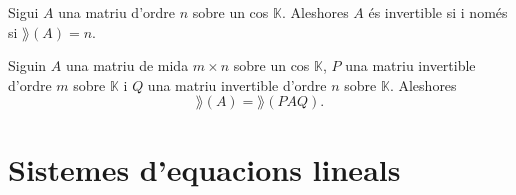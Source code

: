 \documentclass[../Apunts.tex]{subfiles}
\begin{document}
	\begin{corollary}
		Sigui \(A\) una matriu d'ordre \(n\) sobre un cos \(\mathbb{K}\). Aleshores \(A\) és invertible si i només si \(\rang(A)=n\).
	\end{corollary}
	\begin{observation}
		\label{obs:rang d'una matriu és invariant pel producte amb invertibles}
		Siguin \(A\) una matriu de mida \(m\times n\) sobre un cos \(\mathbb{K}\), \(P\) una matriu invertible d'ordre \(m\) sobre \(\mathbb{K}\) i \(Q\) una matriu invertible d'ordre \(n\) sobre \(\mathbb{K}\). Aleshores
		\[\rang(A)=\rang(PAQ).\]
	\end{observation}
	\section{Sistemes d'equacions lineals}
\end{document}

